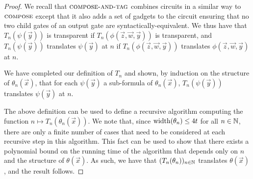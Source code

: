 \documentclass[../paper.tex]{subfiles}
\begin{document}
\begin{proof}
  We recall that ${\normalfont\textsc{compose-and-tag}}$ combines circuits in a similar way to
  ${\normalfont\textsc{compose}}$ except that it also adds a set of gadgets to the circuit
  ensuring that no two child gates of an output gate are
  syntactically-equivalent. We thus have that $T_n(\psi (\vec{y}))$ is
  transparent if $T_n(\phi (\vec{z}, \vec{w},\vec{y}))$ is transparent, and
  $T_n(\psi(\vec{y}))$ translates $\psi (\vec{y})$ at $n$ if $T_n(\phi (\vec{z},
  \vec{w},\vec{y}))$ translates $\phi(\vec{z}, \vec{w}, \vec{y})$ at $n$.

  We have completed our definition of $T_n$ and shown, by induction on the
  structure of $\theta_n(\vec{x})$, that for each $\psi (\vec{y})$ a sub-formula
  of $\theta_n(\vec{x})$, $T_n(\psi(\vec{y}))$ translates $\psi(\vec{y})$ at
  $n$.

  The above definition can be used to define a recursive algorithm computing the
  function $n \mapsto T_n (\theta_n(\vec{x}))$. We note that, since
  $\mathrm{width}(\theta_n) \leq 4 t$ for all $n \in \mathbb{N}$, there are only a finite
  number of cases that need to be considered at each recursive step in this
  algorithm. This fact can be used to show that there exists a polynomial bound
  on the running time of the algorithm that depends only on $n$ and the
  structure of $\theta(\vec{x})$. As such, we have that $(T_n (\theta_n))_{n \in
    \mathbb{N}}$ translates $\theta(\vec{x})$, and the result follows.
\end{proof}


\end{document}
